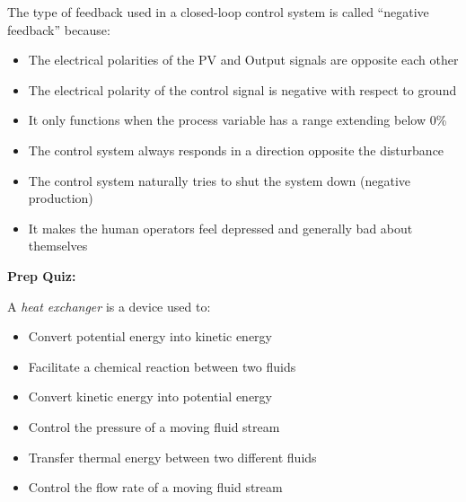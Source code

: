 The type of feedback used in a closed-loop control system is called ``negative feedback'' because:

\begin{itemize}
\item{} The electrical polarities of the PV and Output signals are opposite each other
\vskip 5pt 
\item{} The electrical polarity of the control signal is negative with respect to ground
\vskip 5pt 
\item{} It only functions when the process variable has a range extending below 0\%
\vskip 5pt 
\item{} The control system always responds in a direction opposite the disturbance
\vskip 5pt 
\item{} The control system naturally tries to shut the system down (negative production)
\vskip 5pt 
\item{} It makes the human operators feel depressed and generally bad about themselves
\end{itemize}












\vfil \eject

\noindent
{\bf Prep Quiz:}

A {\it heat exchanger} is a device used to:

\begin{itemize}
\item{} Convert potential energy into kinetic energy
\vskip 5pt 
\item{} Facilitate a chemical reaction between two fluids
\vskip 5pt 
\item{} Convert kinetic energy into potential energy
\vskip 5pt 
\item{} Control the pressure of a moving fluid stream
\vskip 5pt 
\item{} Transfer thermal energy between two different fluids
\vskip 5pt 
\item{} Control the flow rate of a moving fluid stream
\end{itemize}





